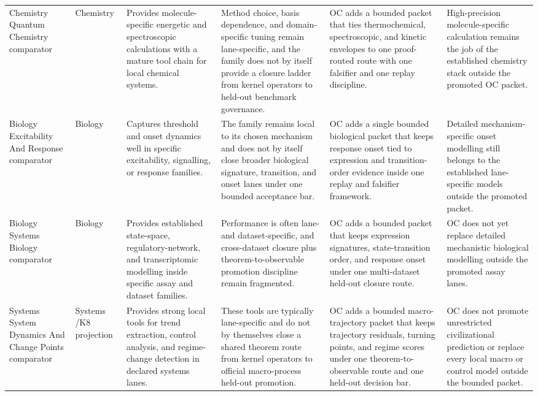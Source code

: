 \begin{longtable}{@{}L{0.17\textwidth}L{0.09\textwidth}L{0.17\textwidth}L{0.17\textwidth}L{0.20\textwidth}L{0.14\textwidth}@{}}
Chemistry Quantum Chemistry comparator & Chemistry & Provides molecule-specific energetic and spectroscopic calculations with a mature tool chain for local chemical systems. & Method choice, basis dependence, and domain-specific tuning remain lane-specific, and the family does not by itself provide a closure ladder from kernel operators to held-out benchmark governance. & OC adds a bounded packet that ties thermochemical, spectroscopic, and kinetic envelopes to one proof-routed route with one falsifier and one replay discipline. & High-precision molecule-specific calculation remains the job of the established chemistry stack outside the promoted OC packet. \\
Biology Excitability And Response comparator & Biology & Captures threshold and onset dynamics well in specific excitability, signalling, or response families. & The family remains local to its chosen mechanism and does not by itself close broader biological signature, transition, and onset lanes under one bounded acceptance bar. & OC adds a single bounded biological packet that keeps response onset tied to expression and transition-order evidence inside one replay and falsifier framework. & Detailed mechanism-specific onset modelling still belongs to the established lane-specific models outside the promoted packet. \\
Biology Systems Biology comparator & Biology & Provides established state-space, regulatory-network, and transcriptomic modelling inside specific assay and dataset families. & Performance is often lane- and dataset-specific, and cross-dataset closure plus theorem-to-observable promotion discipline remain fragmented. & OC adds a bounded packet that keeps expression signatures, state-transition order, and response onset under one multi-dataset held-out closure route. & OC does not yet replace detailed mechanistic biological modelling outside the promoted assay lanes. \\
Systems System Dynamics And Change Points comparator & Systems /\allowbreak K8 projection & Provides strong local tools for trend extraction, control analysis, and regime-change detection in declared systems lanes. & These tools are typically lane-specific and do not by themselves close a shared theorem route from kernel operators to official macro-process held-out promotion. & OC adds a bounded macro-trajectory packet that keeps trajectory residuals, turning points, and regime scores under one theorem-to-observable route and one held-out decision bar. & OC does not promote unrestricted civilizational prediction or replace every local macro or control model outside the bounded packet. \\

\end{longtable}
